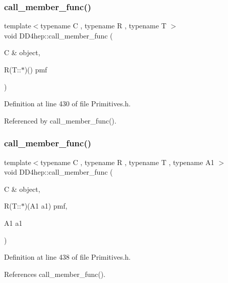 \subsubsection{\texorpdfstring{call\+\_\+member\+\_\+func()}{call\_member\_func()}\hspace{0.1cm}{\footnotesize\ttfamily [1/3]}}
{\footnotesize\ttfamily template$<$typename C , typename R , typename T $>$ \\
void D\+D4hep\+::call\+\_\+member\+\_\+func (\begin{DoxyParamCaption}\item[{C \&}]{object,  }\item[{R(T\+::$\ast$)()}]{pmf }\end{DoxyParamCaption})}



Definition at line 430 of file Primitives.\+h.



Referenced by call\+\_\+member\+\_\+func().

\hypertarget{namespace_d_d4hep_af85c917bc78ceb8bd162191e686578b2}{}\label{namespace_d_d4hep_af85c917bc78ceb8bd162191e686578b2} 
\subsubsection{\texorpdfstring{call\+\_\+member\+\_\+func()}{call\_member\_func()}\hspace{0.1cm}{\footnotesize\ttfamily [2/3]}}
{\footnotesize\ttfamily template$<$typename C , typename R , typename T , typename A1 $>$ \\
void D\+D4hep\+::call\+\_\+member\+\_\+func (\begin{DoxyParamCaption}\item[{C \&}]{object,  }\item[{R(T\+::$\ast$)(A1 a1)}]{pmf,  }\item[{A1}]{a1 }\end{DoxyParamCaption})}



Definition at line 438 of file Primitives.\+h.



References call\+\_\+member\+\_\+func().

\hypertarget{namespace_d_d4hep_a123cb5c06581e94fe514c2da52cd79d6}{}\label{namespace_d_d4hep_a123cb5c06581e94fe514c2da52cd79d6} 
